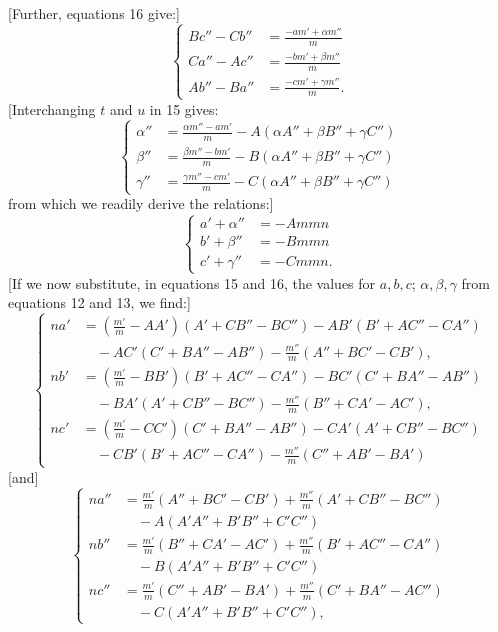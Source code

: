 %
[Further, equations 16 give:]
\begin{equation}\tag*{[19]}
\left\{\begin{aligned}
Bc''-Cb''&=\frac{-am'+\alpha m''}{m}\\
Ca''-Ac''&=\frac{-bm'+\beta m''}{m}\\
Ab''-Ba''&=\frac{-cm'+\gamma m''}{m}.
\end{aligned}\right.
\end{equation}
[Interchanging $t$ and $u$ in 15 gives:
\[
\left\{\begin{aligned}
\alpha''&=\frac{\alpha m''-am'}{m}-A(\alpha A''+\beta B''+\gamma C'')\\
\beta''&=\frac{\beta m''-bm'}{m}-B(\alpha A''+\beta B''+\gamma C'')\\
\gamma''&=\frac{\gamma m''-cm'}{m}-C(\alpha A''+\beta B''+\gamma C'')
\end{aligned}\right.
\]
from which we readily derive the relations:]
\begin{equation}\tag*{[20]}
\left\{\begin{aligned}
a'+\alpha''&=-Ammn\\
b'+\beta''&=-Bmmn\\
c'+\gamma''&=-Cmmn.
\end{aligned}\right.
\end{equation}
[If we now substitute, in equations 15 and 16, the values for $a,b,c$; $\alpha,\beta,\gamma$ from equations 12 and 13, we find:]
\begin{equation}\tag*{[21]}
\left\{\begin{aligned}
na'&=\left(\frac{m'}m-AA'\right)(A'+CB''-BC'')-AB'(B'+AC''-CA'')\\
&\quad-AC'(C'+BA''-AB'')-\frac{m''}m(A''+BC'-CB'),\\[4pt]
nb'&=\left(\frac{m'}m-BB'\right)(B'+AC''-CA'')-BC'(C'+BA''-AB'')\\
&\quad-BA'(A'+CB''-BC'')-\frac{m''}m(B''+CA'-AC'),\\[4pt]
nc'&=\left(\frac{m'}m-CC'\right)(C'+BA''-AB'')-CA'(A'+CB''-BC'')\\
&\quad-CB'(B'+AC''-CA'')-\frac{m''}m(C''+AB'-BA')
\end{aligned}\right.
\end{equation}
[and]
\begin{equation}\tag*{[22]}
\left\{\begin{aligned}
na''&=\frac{m'}m(A''+BC'-CB')+\frac{m''}m(A'+CB''-BC'')\\
&\quad-A(A'A''+B'B''+C'C'')\\[4pt]
nb''&=\frac{m'}m(B''+CA'-AC')+\frac{m''}m(B'+AC''-CA'')\\
&\quad-B(A'A''+B'B''+C'C'')\\[4pt]
nc''&=\frac{m'}m(C''+AB'-BA')+\frac{m''}m(C'+BA''-AC'')\\
&\quad-C(A'A''+B'B''+C'C''),
\end{aligned}\right.
\end{equation}
